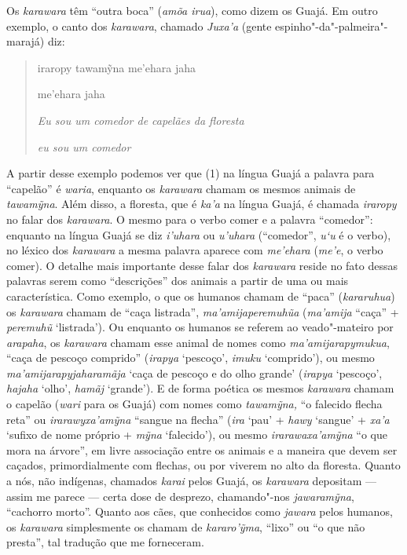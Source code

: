 Os \emph{karawara} têm ``outra boca'' (\emph{amõa irua}), como dizem os
Guajá. Em outro exemplo, o canto dos \emph{karawara}, chamado
\emph{Juxa'a} (gente espinho"-da"-palmeira"-marajá) diz:

\begin{quote}
iraropy tawamỹna me'ehara jaha 

\noindent
me'ehara jaha

\noindent
\emph{}

\noindent
\emph{Eu sou um comedor de capelães da floresta}

\noindent
\emph{eu sou um comedor}
\end{quote}

A partir desse exemplo podemos ver que (1) na língua Guajá a palavra
para ``capelão'' é \emph{waria}, enquanto os \emph{karawara} chamam os
mesmos animais de \emph{tawamỹna}. Além disso, a floresta, que
é \emph{ka'a} na língua Guajá, é chamada \emph{iraropy} no
falar dos \emph{karawara}. O mesmo para o verbo comer e a palavra
``comedor'': enquanto na língua Guajá se diz \emph{i'uhara} ou
\emph{u'uhara} (``comedor'', \emph{u`u} é o verbo), no léxico dos
\emph{karawara} a mesma palavra aparece com \emph{me'ehara}
(\emph{me'e}, o verbo comer). O detalhe mais importante desse falar dos
\emph{karawara} reside no fato dessas palavras serem como ``descrições''
dos animais a partir de uma ou mais característica. Como exemplo, o que
os humanos chamam de ``paca'' (\emph{kararuhua}) os \emph{karawara}
chamam de ``caça listrada'', \emph{ma'amijaperemuhũa} (\emph{ma'amija}
``caça'' + \emph{peremuhũ} `listrada'). Ou enquanto os humanos se
referem ao veado"-mateiro por \emph{arapaha}, os \emph{karawara} chamam
esse animal de nomes como \emph{ma'amijarapymukua}, ``caça de pescoço
comprido'' (\emph{irapya} `pescoço', \emph{imuku} `comprido'), ou mesmo
\emph{ma'amijarapyjaharamãja} `caça de pescoço e do olho grande'
(\emph{irapya} `pescoço', \emph{hajaha} `olho', \emph{hamãj} `grande').
E de forma poética os mesmos \emph{karawara} chamam o capelão
(\emph{wari} para os Guajá) com nomes como \emph{tawamỹna,} ``o falecido
flecha reta'' ou \emph{irarawyxa'amỹna} ``sangue na flecha'' (\emph{ira}
`pau' + \emph{hawy} `sangue' + \emph{xa'a} `sufixo de nome próprio +
\emph{mỹna} `falecido'), ou mesmo \emph{irarawaxa'amỹna} ``o que mora na
árvore'', em livre associação entre os animais e a maneira que devem ser
caçados, primordialmente com flechas, ou por viverem no alto da
floresta. Quanto a nós, não indígenas, chamados \emph{karai} pelos
Guajá, os \emph{karawara} depositam --- assim me parece --- certa dose de
desprezo, chamando"-nos \emph{jawaramỹna}, ``cachorro morto''. Quanto aos
cães, que conhecidos como \emph{jawara} pelos humanos, os
\emph{karawara} simplesmente os chamam de \emph{kararo'ỹma}, ``lixo'' ou ``o
que não presta'', tal tradução que me forneceram.

